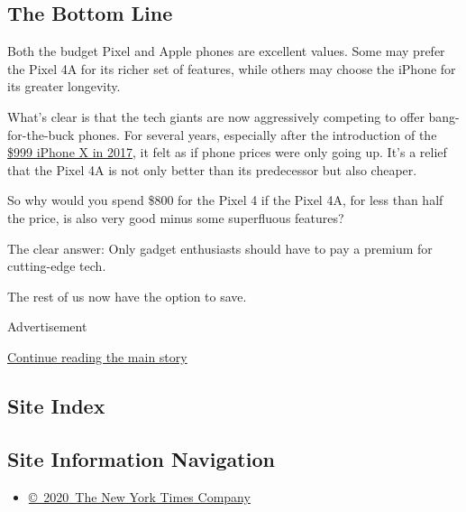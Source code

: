 \hypertarget{the-bottom-line}{%
\subsection{The Bottom Line}\label{the-bottom-line}}

Both the budget Pixel and Apple phones are excellent values. Some may
prefer the Pixel 4A for its richer set of features, while others may
choose the iPhone for its greater longevity.

What's clear is that the tech giants are now aggressively competing to
offer bang-for-the-buck phones. For several years, especially after the
introduction of the
\href{https://www.nytimes3xbfgragh.onion/2017/11/01/technology/personaltech/apple-iphone-x-review.html}{\$999
iPhone X in 2017}, it felt as if phone prices were only going up. It's a
relief that the Pixel 4A is not only better than its predecessor but
also cheaper.

So why would you spend \$800 for the Pixel 4 if the Pixel 4A, for less
than half the price, is also very good minus some superfluous features?

The clear answer: Only gadget enthusiasts should have to pay a premium
for cutting-edge tech.

The rest of us now have the option to save.

Advertisement

\protect\hyperlink{after-bottom}{Continue reading the main story}

\hypertarget{site-index}{%
\subsection{Site Index}\label{site-index}}

\hypertarget{site-information-navigation}{%
\subsection{Site Information
Navigation}\label{site-information-navigation}}

\begin{itemize}
\tightlist
\item
  \href{https://help.nytimes3xbfgragh.onion/hc/en-us/articles/115014792127-Copyright-notice}{©~2020~The
  New York Times Company}
\end{itemize}

